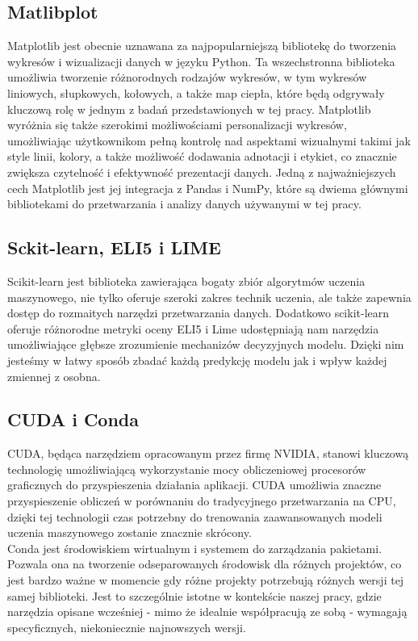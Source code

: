 \documentclass[a4paper,twoside,12pt]{book}
\begin{document}
\subsection{Matlibplot}
Matplotlib jest obecnie uznawana za najpopularniejszą bibliotekę do tworzenia wykresów i wizualizacji danych w języku Python. Ta wszechstronna biblioteka umożliwia tworzenie różnorodnych rodzajów wykresów, w tym wykresów liniowych, słupkowych, kołowych, a także map ciepła, które będą odgrywały kluczową rolę w jednym z badań przedstawionych w tej pracy. Matplotlib wyróżnia się także szerokimi możliwościami personalizacji wykresów, umożliwiając użytkownikom pełną kontrolę nad aspektami wizualnymi takimi jak style linii, kolory, a także możliwość dodawania adnotacji i etykiet, co znacznie zwiększa czytelność i efektywność prezentacji danych. Jedną z najważniejszych cech Matplotlib jest jej integracja z Pandas i NumPy, które są dwiema głównymi bibliotekami do przetwarzania i analizy danych używanymi w tej pracy.

\subsection{Sckit-learn, ELI5 i LIME}
Scikit-learn jest biblioteka zawierająca bogaty zbiór algorytmów uczenia maszynowego, nie tylko oferuje szeroki zakres technik uczenia, ale także zapewnia dostęp do rozmaitych narzędzi przetwarzania danych. Dodatkowo scikit-learn oferuje różnorodne metryki oceny
ELI5 i Lime udostępniają nam narzędzia umożliwiające głębsze zrozumienie mechanizów decyzyjnych modelu. Dzięki nim jesteśmy w łatwy sposób zbadać każdą predykcję modelu jak i wpływ każdej zmiennej z osobna.
\subsection{CUDA i Conda}
CUDA, będąca narzędziem opracowanym przez firmę NVIDIA, stanowi kluczową technologię umożliwiającą wykorzystanie mocy obliczeniowej procesorów graficznych do przyspieszenia działania aplikacji. CUDA umożliwia znaczne przyspieszenie obliczeń w porównaniu do tradycyjnego przetwarzania na CPU, dzięki tej technologii czas potrzebny do trenowania zaawansowanych modeli uczenia maszynowego zostanie znacznie skrócony.\\

Conda jest środowiskiem wirtualnym i systemem do zarządzania pakietami. Pozwala ona na tworzenie odseparowanych środowisk dla różnych projektów, co jest bardzo ważne w momencie gdy różne projekty potrzebują różnych wersji tej samej biblioteki. Jest to szczególnie istotne w kontekście naszej pracy, gdzie narzędzia opisane wcześniej - mimo że idealnie współpracują ze sobą - wymagają specyficznych, niekoniecznie najnowszych wersji.
\end{document}
